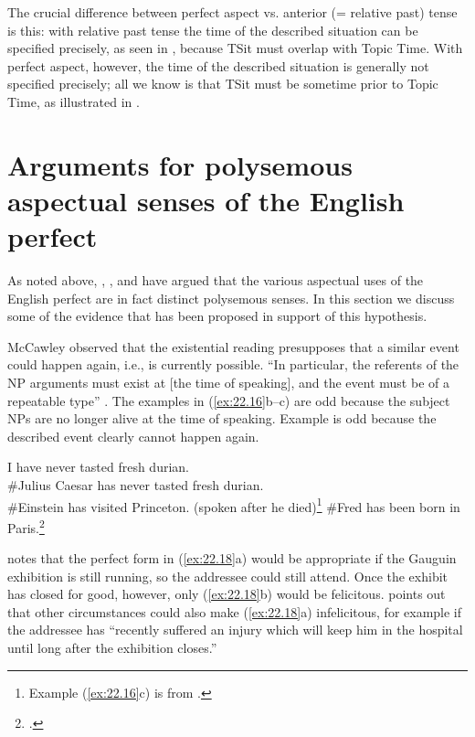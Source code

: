 The crucial difference between perfect aspect vs. anterior (= relative past) tense is this: with relative past tense the time of the described situation can be specified precisely, as seen in , because TSit must overlap with Topic Time. With perfect aspect, however, the time of the described situation is generally not specified precisely; all we know is that TSit must be sometime prior to Topic Time, as illustrated in .


\section{Arguments for polysemous aspectual senses of the English perfect}\label{sec:22.4}

As noted above, \citet{McCawley1971,McCawley1981b}, \citet{Michaelis1994,Michaelis1998}, and \citet{Kiparsky2002} have argued that the various aspectual uses of the English perfect are in fact distinct polysemous senses. In this section we discuss some of the evidence that has been proposed in support of this hypothesis.


McCawley observed that the existential reading presupposes that a similar event could happen again, i.e., is currently possible. “In particular, the referents of the NP arguments must exist at [the time of speaking], and the event must be of a repeatable type” \citep{Kiparsky2002}. The examples in (\ref{ex:22.16}b--c) are odd because the subject NPs are no longer alive at the time of speaking. Example  is odd because the described event clearly cannot happen again. 


\ea \label{ex:22.16}
\ea I have never tasted fresh durian.\\
\ex \#Julius Caesar has never tasted fresh durian.\\
\ex \#Einstein has visited Princeton. (spoken after he died)\footnote{Example (\ref{ex:22.16}c) is from \citet{Chomsky1970}.}
                       \z
\ex \label{ex:22.17}
\#Fred has been born in Paris.\footnote{\citet{Kiparsky2002}.}
\z


\citet[33]{Leech1971} notes that the perfect form in (\ref{ex:22.18}a) would be appropriate if the Gauguin exhibition is still running, so the addressee could still attend. Once the exhibit has closed for good, however, only (\ref{ex:22.18}b) would be felicitous. \citet[107]{McCawley1971} points out that other circumstances could also make (\ref{ex:22.18}a) infelicitous, for example if the addressee has “recently suffered an injury which will keep him in the hospital until long after the exhibition closes.”


